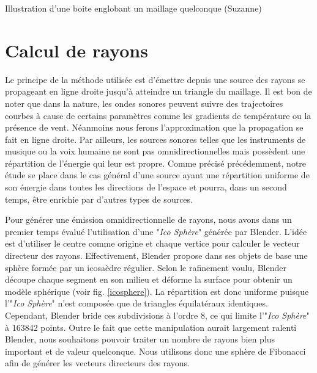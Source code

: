 \begin{figureth}
\begin{subfigureth}{0.35\textwidth}
		\label{boiteenglobante2}
	\end{subfigureth}
	\caption{Illustration d'une boite englobant un maillage quelconque (Suzanne)}
\end{figureth}


\section{Calcul de rayons} \label{sect_rayon}


Le principe de la méthode utilisée est d'émettre depuis une source des rayons se propageant en ligne droite jusqu'à atteindre un triangle du maillage. Il est bon de noter que dans la nature, les ondes sonores peuvent suivre des trajectoires courbes à cause de certains paramètres comme les gradients de température ou la présence de vent. Néanmoins nous ferons l'approximation que la propagation se fait en ligne droite. Par ailleurs, les sources sonores telles que les instruments de musique ou la voix humaine ne sont pas omnidirectionnelles mais possèdent une répartition de l'énergie qui leur est propre. Comme précisé précédemment, notre étude se place dans le cas général d'une source ayant une répartition uniforme de son énergie dans toutes les directions de l'espace et pourra, dans un second temps, être enrichie par d'autres types de sources. 

Pour générer une émission omnidirectionnelle de rayons, nous avons dans un premier temps évalué l'utilisation d'une "\textit{Ico Sphère}" générée par Blender. L'idée est d'utiliser le centre comme origine et chaque vertice pour calculer le vecteur directeur des rayons. Effectivement, Blender propose dans ses objets de base une sphère formée par un icosaèdre régulier. Selon le rafinement voulu, Blender découpe chaque segment en son milieu et déforme la surface pour obtenir un modèle sphérique (voir fig. \ref{icosphere}). La répartition est donc uniforme puisque l'"\textit{Ico Sphère}" n'est composée que de triangles équilatéraux identiques. Cependant, Blender bride ces subdivisions à l'ordre 8, ce qui limite l'"\textit{Ico Sphère}" à 163842 points. Outre le fait que cette manipulation aurait largement ralenti Blender, nous souhaitons pouvoir traiter un nombre de rayons bien plus important et de valeur quelconque. Nous utilisons donc une sphère de Fibonacci afin de générer les vecteurs directeurs des rayons. 

